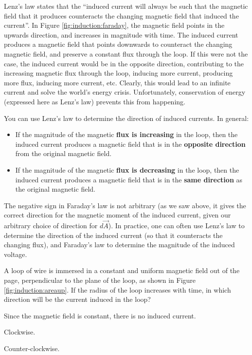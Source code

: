 Lenz's law states that the ``induced current will always be such that the magnetic field that it produces counteracts the changing magnetic field that induced the current''. In Figure \ref{fig:induction:faraday}, the magnetic field points in the upwards direction, and increases in magnitude with time. The induced current produces a magnetic field that points downwards to counteract the changing magnetic field, and preserve a constant flux through the loop. If this were not the case, the induced current would be in the opposite direction, contributing to the increasing magnetic flux through the loop, inducing more current, producing more flux, inducing more current, etc. Clearly, this would lead to an infinite current and solve the world's energy crisis. Unfortunately, conservation of energy (expressed here as Lenz's law) prevents this from happening. 

You can use Lenz's law to determine the direction of induced currents. In general:
\begin{itemize}
\item If the magnitude of the magnetic \textbf{flux is increasing} in the loop, then the induced current produces a magnetic field that is in the \textbf{opposite direction} from the original magnetic field.
\item If the magnitude of the magnetic \textbf{flux is decreasing} in the loop, then the induced current produces a magnetic field that is in the \textbf{same direction} as the original magnetic field.
\end{itemize}

The negative sign in Faraday's law is not arbitrary (as we saw above, it gives the correct direction for the magnetic moment of the induced current, given our arbitrary choice of direction for $d\vec A$). In practice, one can often use Lenz's law to determine the direction of the induced current (so that it counteracts the changing flux), and Faraday's law to determine the magnitude of the induced voltage.

\begin{checkpoint}{}
	\begin{MCquestion}{A loop of wire is immersed in a constant and uniform magnetic field out of the page, perpendicular to the plane of the loop, as shown in Figure \ref{fig:induction:areaup}. If the radius of the loop increases with time, in which direction will be the current induced in the loop?
	}
		\item Since the magnetic field is constant, there is no induced current.
		\item Clockwise. \correct
		\item Counter-clockwise. 
	\end{MCquestion}
\end{checkpoint}

